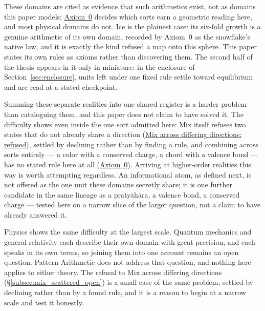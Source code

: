 \documentclass[12pt, a4paper]{article}
\begin{document}
These domains are cited as evidence that such arithmetics exist, not
as domains this paper models;
\hyperref[subsec:axiom0_admissibility]{Axiom~0} decides which sorts
earn a geometric reading here, and most physical domains do not.
Ice is the plainest case: its six-fold growth is a genuine arithmetic
of its own domain, recorded by Axiom~0 as the snowflake's native law,
and it is exactly the kind refused a map onto this sphere. This
paper states its own rules as axioms rather than discovering them.
The second half of the thesis appears in it only in miniature: in the
enclosure of Section~\ref{sec:enclosure}, units left under one fixed rule settle toward equilibrium and are read at a stated checkpoint.

Summing these separate realities into one shared register is a
harder problem than cataloguing them, and this paper does not claim
to have solved it. The difficulty shows even inside the one sort
admitted here: Mix itself refuses two states that do not already
share a direction
(\hyperref[subsec:mix_scattered_open]{Mix across differing
directions: refused}), settled by declining rather than by finding a
rule, and combining across sorts entirely --- a color with a
conserved charge, a chord with a valence bond --- has no stated rule
here at all (\hyperref[subsec:axiom0_admissibility]{Axiom~0}).
Arriving at higher-order realities this way is worth attempting
regardless. An informational atom, as defined next, is not offered
as the one unit these domains secretly share; it is one further
candidate in the same lineage as a pratyāhāra, a valence bond, a
conserved charge --- tested here on a narrow slice of the larger
question, not a claim to have already answered it.

Physics shows the same difficulty at the largest scale. Quantum mechanics and general relativity each describe their own domain with great precision, and each speaks in its own terms, so joining them into one account remains an open question. Pattern Arithmetic does not address that question, and nothing here applies to either theory. The refusal to Mix across differing directions (\S\ref{subsec:mix_scattered_open}) is a small case of the same problem, settled by declining rather than by a found rule, and it is a reason to begin at a narrow scale and test it honestly.
\end{document}
